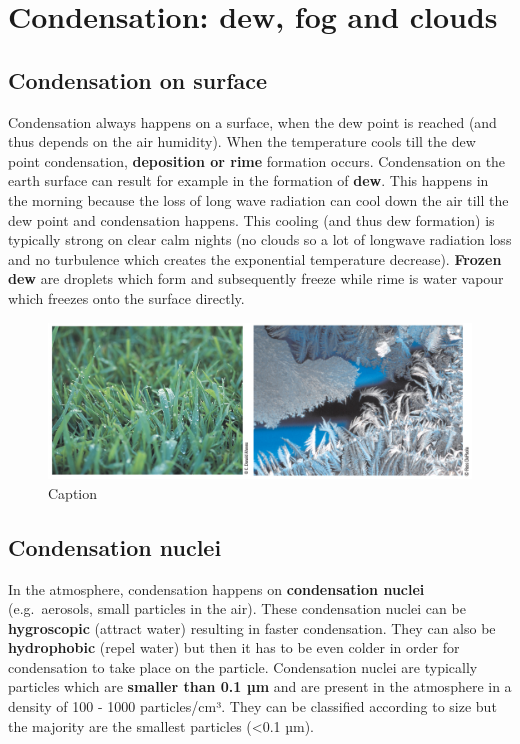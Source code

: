 \documentclass[12pt,oneside]{book}
\begin{document}
\section{Condensation: dew, fog and
clouds}\label{condensation-dew-fog-and-clouds}

\subsection{Condensation on surface}\label{condensation-on-surface}

Condensation always happens on a surface, when the dew point is reached
(and thus depends on the air humidity). When the temperature cools till
the dew point condensation, \textbf{deposition or rime} formation
occurs. Condensation on the earth surface can result for example in the
formation of \textbf{dew}. This happens in the morning because the loss
of long wave radiation can cool down the air till the dew point and
condensation happens. This cooling (and thus dew formation) is typically
strong on clear calm nights (no clouds so a lot of longwave radiation
loss and no turbulence which creates the exponential temperature
decrease). \textbf{Frozen dew} are droplets which form and subsequently
freeze while rime is water vapour which freezes onto the surface
directly.

\begin{figure}

{\centering \includegraphics[width=1\linewidth]{figures/Figure238} 

}

\caption{Caption}\label{fig:Condew}
\end{figure}

\subsection{Condensation nuclei}\label{condensation-nuclei}

In the atmosphere, condensation happens on \textbf{condensation nuclei}
(e.g.~aerosols, small particles in the air). These condensation nuclei
can be \textbf{hygroscopic} (attract water) resulting in faster
condensation. They can also be \textbf{hydrophobic} (repel water) but
then it has to be even colder in order for condensation to take place on
the particle. Condensation nuclei are typically particles which are
\textbf{smaller than 0.1 µm} and are present in the atmosphere in a
density of 100 - 1000 particles/cm³. They can be classified according to
size but the majority are the smallest particles (\textless{}0.1 µm).
\end{document}
